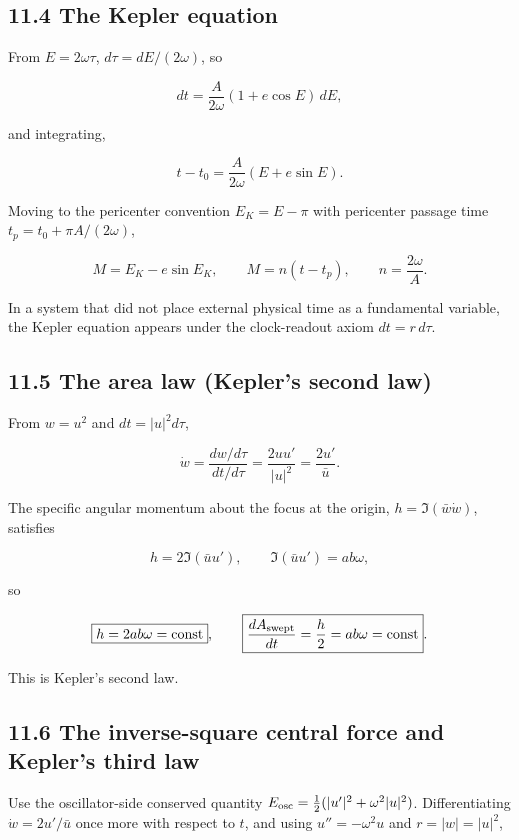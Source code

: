 \documentclass[
  a4paper,
]{article}
\begin{document}
\subsection{11.4 The Kepler equation}\label{the-kepler-equation}

From \(E=2\omega\tau\), \(d\tau=dE/(2\omega)\), so

\[
dt=\frac{A}{2\omega}(1+e\cos E)\,dE,
\]

and integrating,

\[
t-t_0=\frac{A}{2\omega}(E+e\sin E).
\]

Moving to the pericenter convention \(E_K=E-\pi\) with pericenter
passage time \(t_p=t_0+\pi A/(2\omega)\),

\[
\boxed{M=E_K-e\sin E_K},
\qquad
M=n(t-t_p),
\qquad
\boxed{n=\frac{2\omega}A}.
\]

In a system that did not place external physical time as a fundamental
variable, the Kepler equation appears under the clock-readout axiom
\(dt=r\,d\tau\).

\subsection{11.5 The area law (Kepler's second
law)}\label{the-area-law-keplers-second-law}

From \(w=u^2\) and \(dt=|u|^2d\tau\),

\[
\dot w=\frac{dw/d\tau}{dt/d\tau}=\frac{2uu'}{|u|^2}=\frac{2u'}{\bar u}.
\]

The specific angular momentum about the focus at the origin,
\(h=\Im(\bar w\dot w)\), satisfies

\[
h=2\Im(\bar uu'),
\qquad
\Im(\bar uu')=ab\omega,
\]

so

\[
\boxed{h=2ab\omega=\mathrm{const}},
\qquad
\boxed{\frac{dA_{\rm swept}}{dt}=\frac h2=ab\omega=\mathrm{const}}.
\]

This is Kepler's second law.

\subsection{11.6 The inverse-square central force and Kepler's third
law}\label{the-inverse-square-central-force-and-keplers-third-law}

Use the oscillator-side conserved quantity
\(E_{\rm osc}=\frac12(|u'|^2+\omega^2|u|^2)\). Differentiating
\(\dot w=2u'/\bar u\) once more with respect to \(t\), and using
\(u''=-\omega^2u\) and \(r=|w|=|u|^2\),
\end{document}
